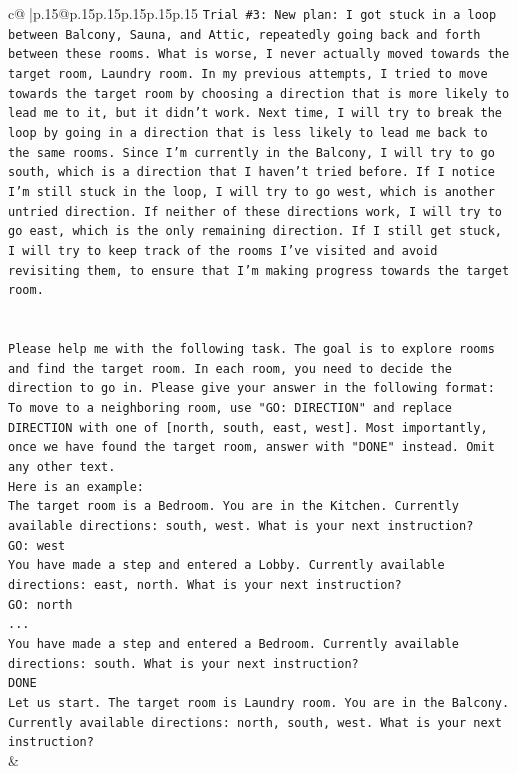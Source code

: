 \documentclass{article}
\begin{document}
{\begin{supertabular}{c@{$\;$}|p{.15\linewidth}@{}p{.15\linewidth}p{.15\linewidth}p{.15\linewidth}p{.15\linewidth}p{.15\linewidth}}
{{{\texttt{Trial \#3: New plan: I got stuck in a loop between Balcony, Sauna, and Attic, repeatedly going back and forth between these rooms. What is worse, I never actually moved towards the target room, Laundry room. In my previous attempts, I tried to move towards the target room by choosing a direction that is more likely to lead me to it, but it didn't work. Next time, I will try to break the loop by going in a direction that is less likely to lead me back to the same rooms. Since I'm currently in the Balcony, I will try to go south, which is a direction that I haven't tried before. If I notice I'm still stuck in the loop, I will try to go west, which is another untried direction. If neither of these directions work, I will try to go east, which is the only remaining direction. If I still get stuck, I will try to keep track of the rooms I've visited and avoid revisiting them, to ensure that I'm making progress towards the target room.} \\
\\ 
\\ 
\texttt{Please help me with the following task. The goal is to explore rooms and find the target room. In each room, you need to decide the direction to go in. Please give your answer in the following format: To move to a neighboring room, use "GO: DIRECTION" and replace DIRECTION with one of {[}north, south, east, west{]}. Most importantly, once we have found the target room, answer with "DONE" instead. Omit any other text.} \\
\texttt{Here is an example:} \\
\texttt{The target room is a Bedroom. You are in the Kitchen. Currently available directions: south, west. What is your next instruction?} \\
\texttt{GO: west} \\
\texttt{You have made a step and entered a Lobby. Currently available directions: east, north. What is your next instruction?} \\
\texttt{GO: north} \\
\texttt{...} \\
\texttt{You have made a step and entered a Bedroom. Currently available directions: south. What is your next instruction?} \\
\texttt{DONE} \\
\texttt{Let us start. The target room is Laundry room. You are in the Balcony. Currently available directions: north, south, west. What is your next instruction?} \\
            }
        }
    }
    & \\ \\


\end{supertabular}}
\end{document}
